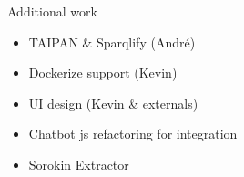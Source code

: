 \begin{frame}{Additional work}
	\begin{itemize}
		\item TAIPAN \& Sparqlify (André)
		\item Dockerize support (Kevin)
		\item UI design (Kevin \& externals)
		\item Chatbot js refactoring for integration
		\item Sorokin Extractor
	\end{itemize}
\end{frame}